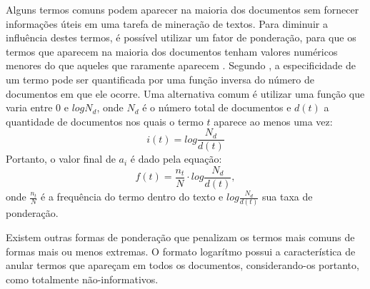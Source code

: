 Alguns termos comuns podem aparecer na maioria dos documentos sem fornecer informações úteis em uma tarefa de mineração de textos. Para diminuir a influência destes termos, é possível utilizar um fator de ponderação, para que os termos que aparecem na maioria dos documentos tenham valores numéricos menores do que aqueles que raramente aparecem \cite{pretext}. Segundo , a especificidade de um termo pode ser quantificada por uma função inversa do número de documentos em que ele ocorre. Uma alternativa comum é utilizar uma função que varia entre \(0\) e \(log N_d\), onde \(N_d\) é o número total de documentos e \(d(t)\) a quantidade de documentos nos quais o termo \(t\) aparece ao menos uma vez:
%
\begin{equation}
i(t)=log \frac{N_d}{d(t)}
\end{equation}
%
Portanto, o valor final de \(a_{i}\) é dado pela equação:
%
\begin{equation}
f(t)=\frac{n_t}{N} \cdot log \frac{N_d}{d(t)},
\end{equation}
%
onde \(\frac{n_t}{N}\) é a frequência do termo dentro do texto e \(log \frac{N_d}{d(t)}\) sua taxa de ponderação.

Existem outras formas de ponderação que penalizam os termos mais comuns de formas mais ou menos extremas.
O formato logarítmo possui a característica de anular termos que apareçam em todos os documentos, considerando-os
portanto, como totalmente não-informativos.
